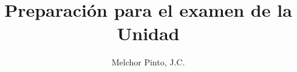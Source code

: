 \documentclass[12pt,addpoint,answers]{repaso}
\title{Preparación para el examen de la Unidad}
\author{Melchor Pinto, J.C.}
\begin{document}
\INFO%
\begin{questions}
    \questionboxed[10]{}
    \ejemplosboxed[]
    \questionboxed[10]{}
    \questionboxed[4]{}
    \questionboxed[4]{}
    \questionboxed[4]{}
    \ejemplosboxed[]
    \questionboxed[20]{}
    \ejemplosboxed[]
    \questionboxed[5]{}
    \ejemplosboxed[]
    \questionboxed[5]{}
    \questionboxed[4]{}
    \questionboxed[4]{}
    \questionboxed[30]{}
\end{questions}
\end{document}
